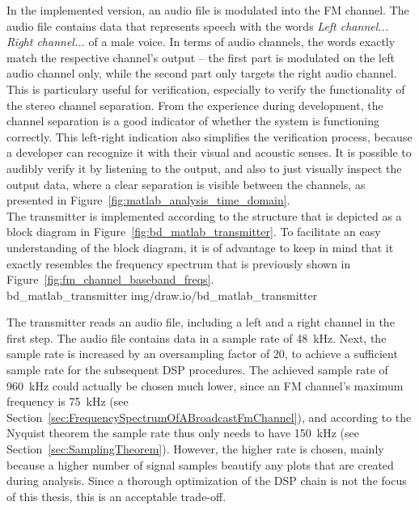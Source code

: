 In the implemented version, an audio file is modulated into the FM channel.
The audio file contains data that represents speech with the words \textit{Left channel... Right channel...} of a male voice.
In terms of audio channels, the words exactly match the respective channel's output -- the first part is modulated on the left audio channel only, while the second part only targets the right audio channel.
This is particulary useful for verification, especially to verify the functionality of the stereo channel separation.
From the experience during development, the channel separation is a good indicator of whether the system is functioning correctly.
This left-right indication also simplifies the verification process, because a developer can recognize it with their visual and acoustic senses.
It is possible to audibly verify it by listening to the output, and also to just visually inspect the output data, where a clear separation is visible between the channels, as presented in Figure~\ref{fig:matlab_analysis_time_domain}.\\

The transmitter is implemented according to the structure that is depicted as a block diagram in Figure~\ref{fig:bd_matlab_transmitter}.
To facilitate an easy understanding of the block diagram, it is of advantage to keep in mind that it exactly resembles the frequency spectrum that is previously shown in Figure~\ref{fig:fm_channel_baseband_freqs}.\\

 {bd_matlab_transmitter} {img/draw.io/bd_matlab_transmitter}

The transmitter reads an audio file, including a left and a right channel in the first step.
The audio file contains data in a sample rate of 48~kHz.
Next, the sample rate is increased by an oversampling factor of 20, to achieve a sufficient sample rate for the subsequent DSP procedures.
The achieved sample rate of 960~kHz could actually be chosen much lower, since an FM channel's maximum frequency is 75~kHz (see Section~\ref{sec:FrequencySpectrumOfABroadcastFmChannel}), and according to the Nyquist theorem the sample rate thus only needs to have 150~kHz (see Section~\ref{sec:SamplingTheorem}).
However, the higher rate is chosen, mainly because a higher number of signal samples beautify any plots that are created during analysis.
Since a thorough optimization of the DSP chain is not the focus of this thesis, this is an acceptable trade-off.\\

